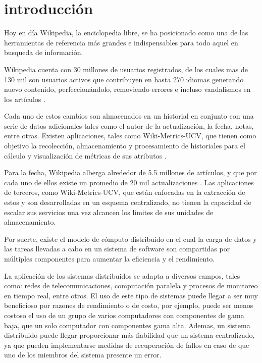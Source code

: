 \section*{introducción}

Hoy en día Wikipedia, la enciclopedia libre, se ha posicionado como una de las herramientas de
referencia más grandes e indispensables para todo aquel en busqueda de información.

Wikipedia cuenta con 30 millones de usuarios registrados, de los cuales mas de 130 mil son
usuarios activos que contribuyen en hasta 270 idiomas generando nuevo contenido, perfeccionándolo,
removiendo errores e incluso vandalismos en los artículos \cite{1}.

Cada uno de estos cambios son almacenados en un historial en conjunto con una serie de datos
adicionales tales como el autor de la actualización, la fecha, notas, entre otras. Existen
aplicaciones, tales como Wiki-Metrics-UCV, que tienen como objetivo la recolección, almacenamiento
y procesamiento de historiales para el cálculo y visualización de métricas de sus atributos \cite{4}.

Para la fecha, Wikipedia alberga alrededor de 5.5 millones de artículos, y que
por cada uno de ellos existe un promedio de 20 mil actualizaciones \cite{2}. Las aplicaciones de terceros,
como Wiki-Metrics-UCV, que están enfocadas en la extracción de estos y son desarrolladas
en un esquema centralizado, no tienen la capacidad de escalar sus servicios una vez alcancen
los limites de sus unidades de almacenamiento.

Por suerte, existe el modelo de cómputo distribuido en el cual la carga de datos y las tareas llevadas a
cabo en un sistema de software son compartidas por múltiples componentes para aumentar la
eficiencia y el rendimiento.

La aplicación de los sistemas distribuidos se adapta a diversos campos, tales como:
redes de telecomunicaciones, computación paralela y procesos de monitoreo en tiempo
real, entre otros. El uso de este tipo de sistemas puede llegar a ser muy beneficioso por
razones de rendimiento o de costo, por ejemplo, puede ser menos costoso el uso de un grupo de varios
computadores con componentes de gama baja, que un solo computador con componentes gama alta. Ademas,
un sistema distribuido puede llegar proporcionar más fiabilidad que un sistema centralizado, ya
que pueden implementarse medidas de recuperación de fallos en caso de que uno de los miembros
del sistema presente un error.


